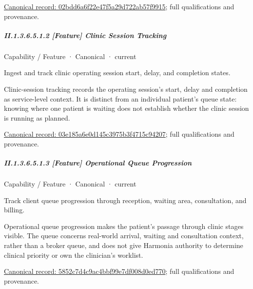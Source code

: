 {\footnotesize \href{../../../../continuum/strategy/capability/feature/02bdd6a6f22e47f5a29d722ab57f9915.md}{Canonical record: 02bdd6a6f22e47f5a29d722ab57f9915}; full qualifications and provenance.}\par
\subparagraph*{II.1.3.6.5.1.2 [Feature] Clinic Session Tracking}
\label{navigation:II.1.3.6.5.1.2}

\label{element:03e185a6e0d145c3975b3f4715c94207}
{\small Capability / Feature · Canonical · current}\par

Ingest and track clinic operating session start, delay, and completion states.



Clinic-session tracking records the operating session's start, delay and completion as service-level context. It is distinct from an individual patient's queue state: knowing where one patient is waiting does not establish whether the clinic session is running as planned.


{\footnotesize \href{../../../../continuum/strategy/capability/feature/03e185a6e0d145c3975b3f4715c94207.md}{Canonical record: 03e185a6e0d145c3975b3f4715c94207}; full qualifications and provenance.}\par
\subparagraph*{II.1.3.6.5.1.3 [Feature] Operational Queue Progression}
\label{navigation:II.1.3.6.5.1.3}

\label{element:5852c7d4c9ac4bbf99e7df008d0ed770}
{\small Capability / Feature · Canonical · current}\par

Track client queue progression through reception, waiting area, consultation, and billing.



Operational queue progression makes the patient's passage through clinic stages visible. The queue concerns real-world arrival, waiting and consultation context, rather than a broker queue, and does not give Harmonia authority to determine clinical priority or own the clinician's worklist.


{\footnotesize \href{../../../../continuum/strategy/capability/feature/5852c7d4c9ac4bbf99e7df008d0ed770.md}{Canonical record: 5852c7d4c9ac4bbf99e7df008d0ed770}; full qualifications and provenance.}\par
